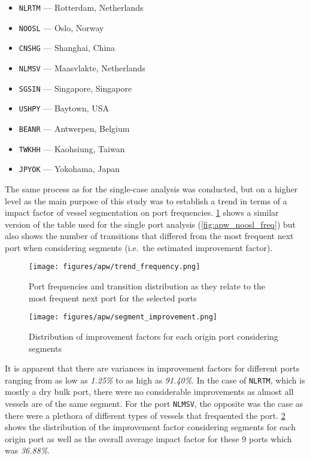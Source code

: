 \begin{itemize}
    \item \texttt{NLRTM} --- Rotterdam, Netherlands
    \item \texttt{NOOSL} --- Oslo, Norway
    \item \texttt{CNSHG} --- Shanghai, China
    \item \texttt{NLMSV} --- Maasvlakte, Netherlands
    \item \texttt{SGSIN} --- Singapore, Singapore
    \item \texttt{USHPY} --- Baytown, USA
    \item \texttt{BEANR} --- Antwerpen, Belgium
    \item \texttt{TWKHH} --- Kaohsiung, Taiwan
    \item \texttt{JPYOK} --- Yokohama, Japan
\end{itemize}

The same process as for the single-case analysis was conducted, but on a higher level as the main purpose of this study was to establish a trend in terms of a impact factor of vessel segmentation on port frequencies. \cref{fig:trend_freq} shows a similar version of the table used for the single port analysis (\cref{fig:apw_noosl_freq}) but also shows the number of transitions that differed from the most frequent next port when considering segments (i.e.\ the estimated improvement factor).

\begin{figure}[htbp]
    \centering
    \texttt{[image: figures/apw/trend\_frequency.png]}
    \caption{Port frequencies and transition distribution as they relate to the most frequent next port for the selected ports}
    \label{fig:trend_freq}
\end{figure}

\begin{figure}[htbp]
    \centering
    \texttt{[image: figures/apw/segment\_improvement.png]}
    \caption{Distribution of improvement factors for each origin port considering segments}
    \label{fig:segment_improvment}
\end{figure}

It is apparent that there are variances in improvement factors for different ports ranging from as low as \textit{1.25\%} to as high as \textit{91.40\%}. In the case of \texttt{NLRTM}, which is mostly a dry bulk port, there were no considerable improvements as almost all vessels are of the same segment. For the port \texttt{NLMSV}, the opposite was the case as there were a plethora of different types of vessels that frequented the port. \cref{fig:segment_improvment} shows the distribution of the improvement factor considering segments for each origin port as well as the overall average impact factor for these 9 ports which was \textit{36.88\%}.

